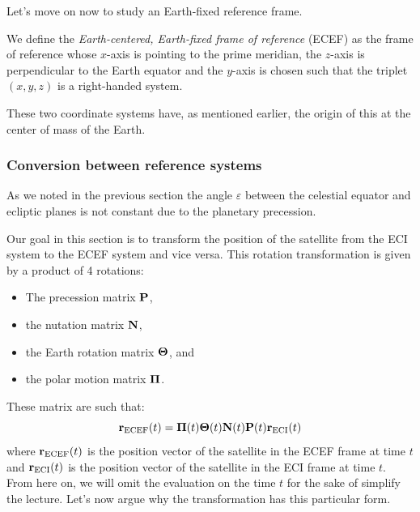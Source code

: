 \documentclass[../main.tex]{subfiles}
\begin{document}
Let's move on now to study an Earth-fixed reference frame.
\begin{definition}
  We define the \emph{Earth-centered, Earth-fixed frame of reference} (ECEF) as the frame of reference whose $x$-axis is pointing to the prime meridian, the $z$-axis is perpendicular to the Earth equator and the $y$-axis is chosen such that the triplet $(x,y,z)$ is a right-handed system.
\end{definition}
These two coordinate systems have, as mentioned earlier, the origin of this at the center of mass of the Earth.
\subsubsection{Conversion between reference systems}

As we noted in the previous section the angle $\varepsilon$ between the celestial equator and ecliptic planes is not constant due to the planetary precession.

Our goal in this section is to transform the position of the satellite from the ECI system to the ECEF system and vice versa. This rotation transformation is given by a product of 4 rotations:
\begin{itemize}
  \item The precession matrix $\boldsymbol{\mathrm{P}}$,
  \item the nutation matrix $\boldsymbol{\mathrm{N}}$,
  \item the Earth rotation matrix $\boldsymbol{\mathrm{\Theta}}$, and
  \item the polar motion matrix $\boldsymbol{\mathrm{\Pi}}$.
\end{itemize}
These matrix are such that:
\begin{equation}
  \boldsymbol{\mathrm{r}}_\mathrm{ECEF}(t)=\boldsymbol{\mathrm{\Pi}}(t)\boldsymbol{\mathrm{\Theta}}(t)\boldsymbol{\mathrm{N}}(t)\boldsymbol{\mathrm{P}}(t)\boldsymbol{\mathrm{r}}_\mathrm{ECI}(t)
\end{equation}
where $\boldsymbol{\mathrm{r}}_\mathrm{ECEF}(t)$ is the position vector of the satellite in the ECEF frame at time $t$ and $\boldsymbol{\mathrm{r}}_\mathrm{ECI}(t)$ is the position vector of the satellite in the ECI frame at time $t$. From here on, we will omit the evaluation on the time $t$ for the sake of simplify the lecture. Let's now argue why the transformation has this particular form.
\end{document}
